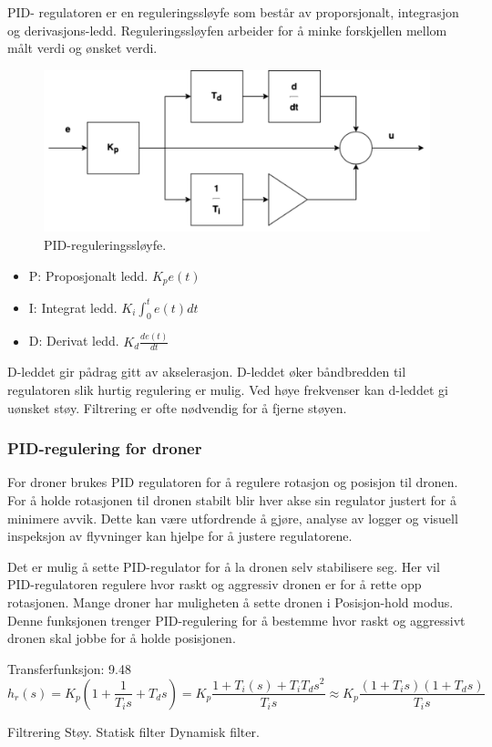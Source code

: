 PID- regulatoren er en reguleringssløyfe som består av proporsjonalt, integrasjon og derivasjons-ledd. 
Reguleringssløyfen arbeider for å minke forskjellen mellom målt verdi og ønsket verdi.

\begin{figure}[htp]
    \centering
    \includegraphics[width=0.7\columnwidth]{figures/reguleringssloyfe}
    \caption{PID-reguleringssløyfe.}
    \label{fig:reguleringssloyfe}
\end{figure}

\begin{itemize}
\item P: Proposjonalt ledd. $K_pe(t)$
\item I: Integrat ledd. $K_i \int_0^t e(t) dt$
\item D: Derivat ledd. $ K_d \frac{d e(t)}{dt} $
\end{itemize}

D-leddet gir pådrag gitt av akselerasjon.  D-leddet øker båndbredden til regulatoren slik hurtig regulering er mulig. 
Ved høye frekvenser kan d-leddet gi uønsket støy. Filtrering er ofte nødvendig for å fjerne støyen. \parencite{Balchen2000} 

\subsubsection{PID-regulering for droner}
For droner brukes PID regulatoren for å regulere rotasjon og posisjon til dronen. 
For å holde rotasjonen til dronen stabilt blir hver akse sin regulator justert for å minimere avvik. 
Dette kan være utfordrende å gjøre, analyse av logger og visuell inspeksjon av flyvninger kan hjelpe for å justere regulatorene.

Det er mulig å sette PID-regulator for å la dronen selv stabilisere seg. 
Her vil PID-regulatoren regulere hvor raskt og aggressiv dronen er for å rette opp rotasjonen. 
Mange droner har muligheten å sette dronen i Posisjon-hold modus. 
Denne funksjonen trenger PID-regulering for å bestemme hvor raskt og aggressivt dronen skal jobbe for å holde posisjonen. 

Transferfunksjon: 9.48
\[h_r(s) = K_p(1+\frac{1}{T_is}+T_ds) = K_p \frac{1+T_i(s)+T_iT_ds^2}{T_is} \approx K_p \frac{(1+T_is)(1+T_ds)}{T_is}\]

Filtrering
Støy. Statisk filter Dynamisk filter.
